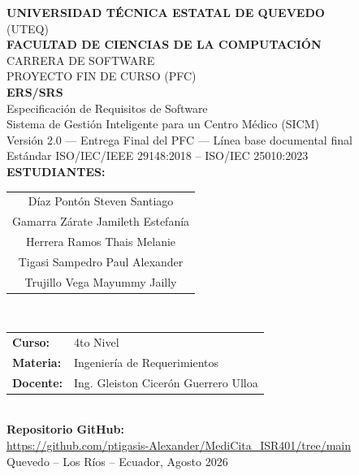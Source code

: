 \documentclass[11pt,a4paper]{article}
\begin{document}
	
	\begin{titlepage}
		\centering
		\vspace*{0.5cm}
		
		{\LARGE\bfseries\color{black} UNIVERSIDAD TÉCNICA ESTATAL DE QUEVEDO}\\[0.5cm]
		{\large (UTEQ)}\\[1.2cm]
		
		{\Large\bfseries FACULTAD DE CIENCIAS DE LA COMPUTACIÓN}\\[0.3cm]
		{\large CARRERA DE SOFTWARE}\\[0.3cm]
		{\large PROYECTO FIN DE CURSO (PFC)}\\[1.5cm]
		
		{\LARGE\bfseries ERS/SRS}\\[0.3cm]
		{\Large Especificación de Requisitos de Software}\\[0.3cm]
		{\Large Sistema de Gestión Inteligente para un Centro Médico (SICM)}\\[0.5cm]
		
		
		{\large Versión 2.0 --- Entrega Final del PFC --- Línea base documental final}\\[0.2cm]
		{\normalsize Estándar ISO/IEC/IEEE 29148:2018 -- ISO/IEC 25010:2023}\\[1.5cm]
		
		{\large\bfseries ESTUDIANTES:}\\[0.3cm]
		\begin{tabular}{c}
			Díaz Pontón Steven Santiago \\
			Gamarra Zárate Jamileth Estefanía \\
			Herrera Ramos Thais Melanie \\
			Tigasi Sampedro Paul Alexander \\
			Trujillo Vega Mayummy Jailly
		\end{tabular}\\[1.2cm]
		
		\begin{tabular}{ll}
			\textbf{Curso:} & 4to Nivel \\
			\textbf{Materia:} & Ingeniería de Requerimientos  \\
			\textbf{Docente:} & Ing. Gleiston Cicerón Guerrero Ulloa \\
		\end{tabular}\\[1.2cm]
		
		{\small\textbf{Repositorio GitHub:}\\
			\url{https://github.com/ptigasis-Alexander/MediCita_ISR401/tree/main}}\\[1.5cm]
		
		
		\vfill
		{\normalsize Quevedo -- Los Ríos -- Ecuador, Agosto 2026}
		
	\end{titlepage}
	
\end{document}
